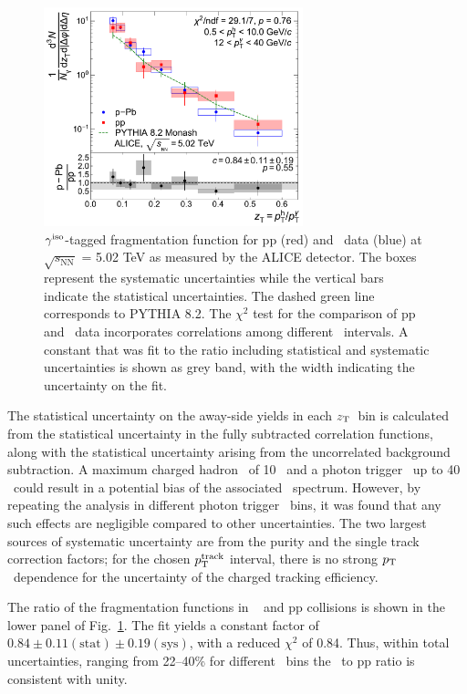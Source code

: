 \begin{figure}
    \centering
    \includegraphics[width=0.67\textwidth]{Data_Analysis/gammahadron/Final_FFunction_and_Ratio.pdf}
    \caption{$\gamma^\mathrm{iso}$-tagged fragmentation function for pp (red) and \pPb~data (blue) at $\sqrt{s_\mathrm{NN}}$ = 5.02 TeV as measured by the ALICE detector. The boxes represent the systematic uncertainties while the vertical bars indicate the statistical uncertainties. The dashed green line corresponds to \textsc{PYTHIA 8.2}. The $\chi^2$ test for the comparison of pp and \pPb~data incorporates correlations among different \zt~intervals. A constant that was fit to the ratio including statistical and systematic uncertainties is shown as grey band, with the width indicating the uncertainty on the fit.}
    \label{fig:Fragmentation_Functions}
\end{figure}

The statistical uncertainty on the away-side yields in each $z_{\mathrm{T}}$~bin is calculated from the statistical uncertainty in the fully subtracted correlation functions, along with the statistical uncertainty arising from the uncorrelated background subtraction. A maximum charged hadron \pt~of 10 \GeVc~and a photon trigger \pt~up to 40 \GeVc~could result in a potential bias of the associated \zt~spectrum. However, by repeating the analysis in different photon trigger \pt~bins, it was found that any such effects are negligible compared to other uncertainties. The two largest sources of systematic uncertainty are from the purity and the single track correction factors; for the chosen $p_{\mathrm{T}}^{\mathrm{track}}$ interval, there is no strong $p_{\mathrm{T}}$~dependence for the uncertainty of the charged tracking efficiency.

 The ratio of the fragmentation functions in \pPb~ and pp collisions is shown in the lower panel of Fig.~\ref{fig:Fragmentation_Functions}.
The fit yields a constant factor of $0.84\pm0.11\mathrm{(stat)}\pm0.19\mathrm{(sys)}$, with a reduced $\chi^{2}$ of 0.84.  
 Thus, within total uncertainties, ranging from 22--40\% for different \zt~bins the \pPb~to pp ratio is consistent with unity. %


